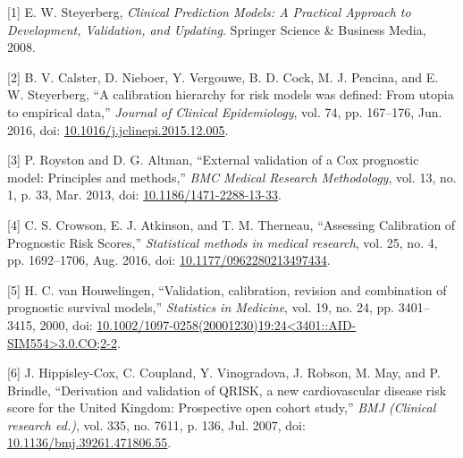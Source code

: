 \documentclass[12pt,PhD,twoside,openright]{muthesis}
\newenvironment{cslreferences}%
  {}%
  {\par}
\begin{document}


\noindent

\setlength{\parindent}{-0.20in}
\setlength{\leftskip}{0.20in}
\setlength{\parskip}{8pt}

\hypertarget{refs}{}
\begin{cslreferences}
\leavevmode\hypertarget{ref-steyerberg_clinical_2008}{}%
{[}1{]} E. W. Steyerberg, \emph{Clinical Prediction Models: A Practical Approach to Development, Validation, and Updating}. Springer Science \& Business Media, 2008.

\leavevmode\hypertarget{ref-calster_calibration_2016-1}{}%
{[}2{]} B. V. Calster, D. Nieboer, Y. Vergouwe, B. D. Cock, M. J. Pencina, and E. W. Steyerberg, ``A calibration hierarchy for risk models was defined: From utopia to empirical data,'' \emph{Journal of Clinical Epidemiology}, vol. 74, pp. 167--176, Jun. 2016, doi: \href{https://doi.org/10.1016/j.jclinepi.2015.12.005}{10.1016/j.jclinepi.2015.12.005}.

\leavevmode\hypertarget{ref-royston_external_2013}{}%
{[}3{]} P. Royston and D. G. Altman, ``External validation of a Cox prognostic model: Principles and methods,'' \emph{BMC Medical Research Methodology}, vol. 13, no. 1, p. 33, Mar. 2013, doi: \href{https://doi.org/10.1186/1471-2288-13-33}{10.1186/1471-2288-13-33}.

\leavevmode\hypertarget{ref-crowson_assessing_2016}{}%
{[}4{]} C. S. Crowson, E. J. Atkinson, and T. M. Therneau, ``Assessing Calibration of Prognostic Risk Scores,'' \emph{Statistical methods in medical research}, vol. 25, no. 4, pp. 1692--1706, Aug. 2016, doi: \href{https://doi.org/10.1177/0962280213497434}{10.1177/0962280213497434}.

\leavevmode\hypertarget{ref-houwelingen_validation_2000}{}%
{[}5{]} H. C. van Houwelingen, ``Validation, calibration, revision and combination of prognostic survival models,'' \emph{Statistics in Medicine}, vol. 19, no. 24, pp. 3401--3415, 2000, doi: \href{https://doi.org/10.1002/1097-0258(20001230)19:24\%3C3401::AID-SIM554\%3E3.0.CO;2-2}{10.1002/1097-0258(20001230)19:24\textless3401::AID-SIM554\textgreater3.0.CO;2-2}.

\leavevmode\hypertarget{ref-hippisley-cox_derivation_2007}{}%
{[}6{]} J. Hippisley-Cox, C. Coupland, Y. Vinogradova, J. Robson, M. May, and P. Brindle, ``Derivation and validation of QRISK, a new cardiovascular disease risk score for the United Kingdom: Prospective open cohort study,'' \emph{BMJ (Clinical research ed.)}, vol. 335, no. 7611, p. 136, Jul. 2007, doi: \href{https://doi.org/10.1136/bmj.39261.471806.55}{10.1136/bmj.39261.471806.55}.


\end{cslreferences}
\end{document}
